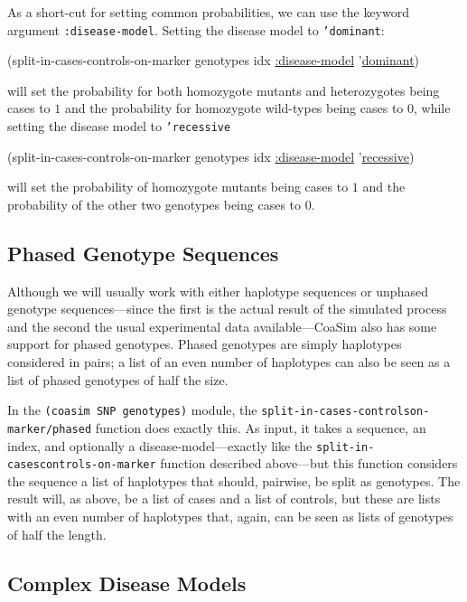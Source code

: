 \documentclass{manual}
\begin{document}
\begin{empfile}
As a short-cut for setting common probabilities, we can use the
keyword argument \texttt{:disease-model}.  Setting the disease model
to \texttt{'dominant}:
\begin{code}
(split-in-cases-controls-on-marker genotypes idx
                                   \underline{:disease-model} '\underline{dominant})
\end{code}
will set the probability for both homozygote mutants and heterozygotes
being cases to $1$ and the probability for homozygote wild-types being
cases to $0$, while setting the disease model to \texttt{'recessive}
\begin{code}
(split-in-cases-controls-on-marker genotypes idx
                                   \underline{:disease-model} '\underline{recessive})
\end{code}
will set the probability of homozygote mutants being cases to $1$ and
the probability of the other two genotypes being cases to $0$.


\subsection{Phased Genotype Sequences}
\label{sec:phased-genotypes}

Although we will usually work with either haplotype sequences or
unphased genotype sequences---since the first is the actual result of
the simulated process and the second the usual experimental data
available---CoaSim also has some support for phased genotypes.  Phased
genotypes are simply haplotypes considered in pairs; a list of an even
number of haplotypes can also be seen as a list of phased genotypes of
half the size.

In the \texttt{(coasim SNP genotypes)} module, the
\texttt{split-in-cases-controls\-on-marker/phased} function does
exactly this.  As input, it takes a sequence, an index, and optionally
a disease-model---exactly like the
\texttt{split-in-cases\-controls-on-marker} function described
above---but this function considers the sequence a list of haplotypes
that should, pairwise, be split as genotypes.  The result will, as
above, be a list of cases and a list of controls, but these are lists
with an even number of haplotypes that, again, can be seen as lists of
genotypes of half the length.


\subsection{Complex Disease Models}
\label{sec:compl-dise-models}


\end{empfile}
\end{document}
